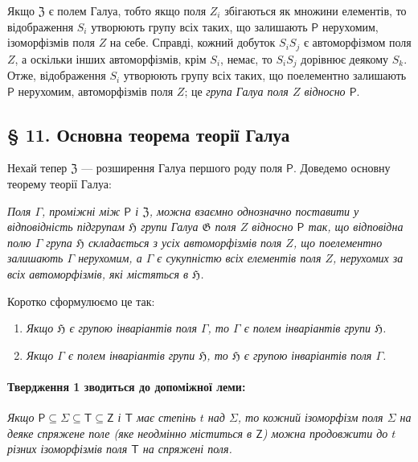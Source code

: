\documentclass[11pt]{article}
\begin{document}
Якщо \(\mathfrak Z\) є полем Галуа, тобто якщо поля \(Z_i\) збігаються як множини елементів, то відображення \(S_i\) утворюють групу всіх таких, що залишають \(\mathsf P\) нерухомим, ізоморфізмів поля \(Z\) на себе. Справді, кожний добуток \(S_iS_j\) є автоморфізмом поля \(Z\), а оскільки інших автоморфізмів, крім \(S_i\), немає, то \(S_iS_j\) дорівнює деякому \(S_k\). Отже, відображення \(S_i\) утворюють групу всіх таких, що поелементно залишають \(\mathsf P\) нерухомим, автоморфізмів поля \(Z\); це \emph{група Галуа поля \(Z\) відносно \(\mathsf P\)}.

\subsection*{§ 11. Основна теорема теорії Галуа}\label{der-hauptsatz-der-galoisschen-theorie}

Нехай тепер \(\mathfrak Z\) --- розширення Галуа першого роду поля \(\mathsf P\). Доведемо основну теорему теорії Галуа:

\emph{Поля \(\Gamma\), проміжні між \(\mathsf P\) і \(\mathfrak Z\), можна взаємно однозначно поставити у відповідність підгрупам \(\mathfrak H\) групи Галуа \(\mathfrak G\) поля \(Z\) відносно \(\mathsf P\) так, що відповідна полю \(\Gamma\) група \(\mathfrak H\) складається з усіх автоморфізмів поля \(Z\), що поелементно залишають \(\Gamma\) нерухомим, а \(\Gamma\) є сукупністю всіх елементів поля \(Z\), нерухомих за всіх автоморфізмів, які містяться в \(\mathfrak H\).}

Коротко сформулюємо це так:

\begin{enumerate}
\item \emph{Якщо \(\mathfrak H\) є групою інваріантів поля \(\Gamma\), то \(\Gamma\) є полем інваріантів групи \(\mathfrak H\).}
\item \emph{Якщо \(\Gamma\) є полем інваріантів групи \(\mathfrak H\), то \(\mathfrak H\) є групою інваріантів поля \(\Gamma\).}
\end{enumerate}

\paragraph{Твердження 1 зводиться до допоміжної леми:}\label{laesst-sich-zurueckfuehren-auf-den-hilfssatz}

\emph{Якщо \(\mathsf P \subseteq \Sigma \subseteq \mathsf T \subseteq \mathsf Z\) і \(\mathsf T\) має степінь \(t\) над \(\Sigma\), то кожний ізоморфізм поля \(\Sigma\) на деяке спряжене поле (яке неодмінно міститься в \(\mathsf Z\)) можна продовжити до \(t\) різних ізоморфізмів поля \(\mathsf T\) на спряжені поля.}
\end{document}
